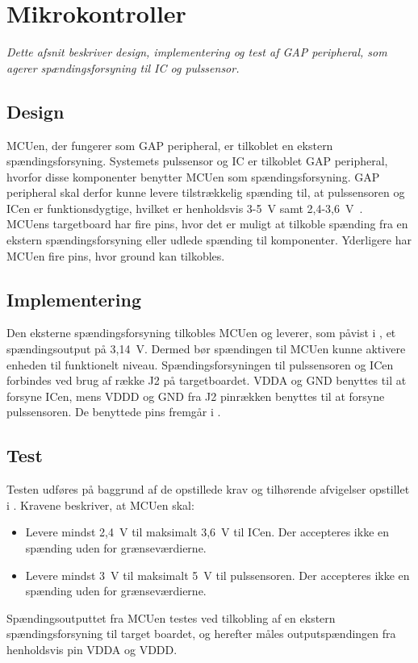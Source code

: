\section{Mikrokontroller}
\textit{Dette afsnit beskriver design, implementering og test af GAP peripheral, som agerer spændingsforsyning til IC og pulssensor.}

\subsection{Design}
MCUen, der fungerer som GAP peripheral, er tilkoblet en ekstern spændingsforsyning. Systemets pulssensor og IC er tilkoblet GAP peripheral, hvorfor disse komponenter benytter MCUen som spændingsforsyning. GAP peripheral skal derfor kunne levere tilstrækkelig spænding til, at pulssensoren og ICen er funktionsdygtige, hvilket er henholdsvis 3-5~V samt 2,4-3,6~V~\citep{Jimb02016,Murphy2016}. \\
MCUens targetboard har fire pins, hvor det er muligt at tilkoble spænding fra en ekstern spændingsforsyning eller udlede spænding til komponenter. Yderligere har MCUen fire pins, hvor ground kan tilkobles.~\citep{Semiconductor2016}

\subsection{Implementering}
Den eksterne spændingsforsyning tilkobles MCUen og leverer, som påvist i , et spændingsoutput på 3,14~V. Dermed bør spændingen til MCUen kunne aktivere enheden til funktionelt niveau.
Spændingsforsyningen til pulssensoren og ICen forbindes ved brug af række J2 på targetboardet. VDDA og GND benyttes til at forsyne ICen, mens VDDD og GND fra J2 pinrækken benyttes til at forsyne pulssensoren. De benyttede pins fremgår i .

\subsection{Test}
Testen udføres på baggrund af de opstillede krav og tilhørende afvigelser opstillet i . Kravene beskriver, at MCUen skal:
\begin{itemize}
	\item Levere mindst 2,4~V til maksimalt 3,6~V til ICen. Der accepteres ikke en spænding uden for grænseværdierne.
	\item Levere mindst 3~V til maksimalt 5~V til pulssensoren. Der accepteres ikke en spænding uden for grænseværdierne.
\end{itemize}
Spændingsoutputtet fra MCUen testes ved tilkobling af en ekstern spændingsforsyning til target boardet, og herefter måles outputspændingen fra henholdsvis pin VDDA og VDDD.

